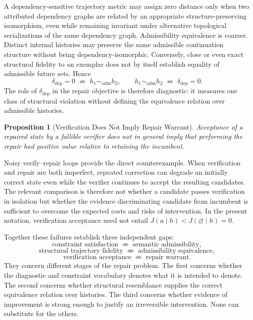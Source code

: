 \documentclass[11pt]{article}
\newtheorem{proposition}{Proposition}[section]
\begin{document}
A dependency-sensitive trajectory metric may assign zero distance only
when two attributed dependency graphs are related by an appropriate
structure-preserving isomorphism, even while remaining invariant under
alternative topological serializations of the same dependency graph.
Admissibility equivalence is coarser. Distinct internal histories may
preserve the same admissible continuation structure without being
dependency-isomorphic. Conversely, close or even exact structural
fidelity to an exemplar does not by itself establish equality of
admissible future sets. Hence
\[
	\delta_{\mathrm{dep}} = 0 \;\not\Rightarrow\; h_1 \sim_{\mathrm{adm}} h_2,
	\qquad
	h_1 \sim_{\mathrm{adm}} h_2 \;\not\Rightarrow\; \delta_{\mathrm{dep}} = 0.
\]
The role of $\delta_{\mathrm{dep}}$ in the repair objective is therefore
diagnostic: it measures one class of structural violation without
defining the equivalence relation over admissible histories.

\begin{proposition}[Verification Does Not Imply Repair Warrant]
	Acceptance of a repaired state by a fallible verifier does not in
	general imply that performing the repair had positive value relative to
	retaining the incumbent.
\end{proposition}

Noisy verify--repair loops provide the direct counterexample. When
verification and repair are both imperfect, repeated correction can
degrade an initially correct state even while the verifier continues to
accept the resulting candidates. The relevant comparison is therefore
not whether a candidate passes verification in isolation but whether the
evidence discriminating candidate from incumbent is sufficient to
overcome the expected costs and risks of intervention. In the present
notation, verification acceptance need not entail
$J(a \mid h) < J(\varnothing \mid h) = 0$.

Together these failures establish three independent gaps:
\[
	\text{constraint satisfaction} \;\not\Rightarrow\; \text{semantic admissibility},
\]
\[
	\text{structural trajectory fidelity} \;\not\Leftrightarrow\; \text{admissibility equivalence},
\]
\[
	\text{verification acceptance} \;\not\Rightarrow\; \text{repair warrant}.
\]
They concern different stages of the repair problem. The first concerns
whether the diagnostic and constraint vocabulary denotes what it is
intended to denote. The second concerns whether structural resemblance
supplies the correct equivalence relation over histories. The third
concerns whether evidence of improvement is strong enough to justify an
irreversible intervention. None can substitute for the others.
\end{document}
